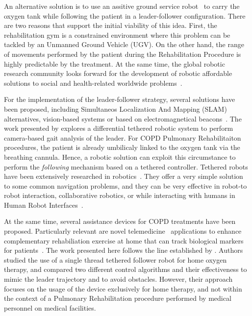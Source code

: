 \documentclass[journal]{IEEEtran}
\begin{document}

An alternative solution is to use an assitive ground service robot~\cite{Neto2015} to carry the oxygen tank while following the patient in a leader-follower configuration.  There are two reasons that support the initial viability of this idea.  First,  the rehabilitation gym is a constrained environment where this problem can be tackled by an Unmanned Ground Vehicle (UGV).  On the other hand, the range of movements performed by the patient during the Rehabilitation Procedure is highly predictable by the treatment.  At the same time,  the global robotic research community looks forward for the development of robotic affordable solutions to social and health-related worldwide problems~\cite{Khamis2019}.

For the implementation of the leader-follower strategy, several solutions have been proposed, including Simultaneos Localization And Mapping (SLAM) alternatives, vision-based systems or based on electromagnetical beacons~\cite{Islam2019}.   The work presented by \cite{Ortlieb2016} explores a differential tethered robotic system to perform camera-based gait analysis of the leader.  For COPD Pulmonary Rehabilitaiton procedures, the patient is already umbilicaly linked to the oxygen tank via the breathing cannula.  Hence, a robotic solution can exploit this circumstance to perform the \textit{following} mechanism based on a tethered controller. Tethered robots have been extensively researched in robotics~\cite{Ahn2006}.  They offer a very simple solution to some common navigation problems, and they can be very effective in robot-to robot interaction, collaborative robotics, or while interacting with humans in Human Robot Interfaces~\cite{Rekleitis2001,Hirata2009,Ferrin2010}. 

At the same time, several assistance devices for COPD treatments have been proposed.  Particularly relevant are novel telemedicine~\cite{Banerjee2020} applications to enhance complementary rehabiliation exercise at home that can track biological markers for patients~\cite{Yang2018,Wu2012}.  The work presented here follows the line established by \cite{Endo2015}.  Authors studied the use of a single thread tethered follower robot for home oxygen therapy, and compared two different control algorithms and their effectiveness to mimic the leader trajectory and to avoid obstacles.  However, their approach focuses on the usage of the device exclusively for home therapy, and not within the context of a Pulmonary Rehabilitation procedure performed by medical personnel on medical facilities.
\end{document}
